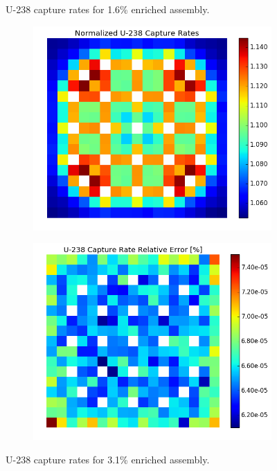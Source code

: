\begin{figure}[h!]
\begin{subfigure}{0.5\textwidth}
  \caption{}
  \label{fig:chap7-capt-rate-rel-err-1.6-assm}
\end{subfigure}%
\caption[U-238 capture rates for 1.6\% enriched assembly]{U-238 capture rates for 1.6\% enriched assembly.}
\label{fig:chap7-capt-rates-1.6-assm}
\end{figure}

\begin{figure}[h!]
\centering
\begin{subfigure}{0.5\textwidth}
  \centering
  \includegraphics[width=\linewidth]{figures/benchmarks/capture-rates/capt-mean-fuel-31}
  \caption{}
  \label{fig:chap7-capt-rate-mean-3.1-assm}
\end{subfigure}%
\begin{subfigure}{0.5\textwidth}
  \centering
  \includegraphics[width=\linewidth]{figures/benchmarks/capture-rates/capt-rel-err-fuel-31}
  \caption{}
  \label{fig:chap7-capt-rate-rel-err-3.1-assm}
\end{subfigure}%
\caption[U-238 capture rates for 3.1\% enriched assembly]{U-238 capture rates for 3.1\% enriched assembly.}
\label{fig:chap7-capt-rates-3.1-assm}
\end{figure}

